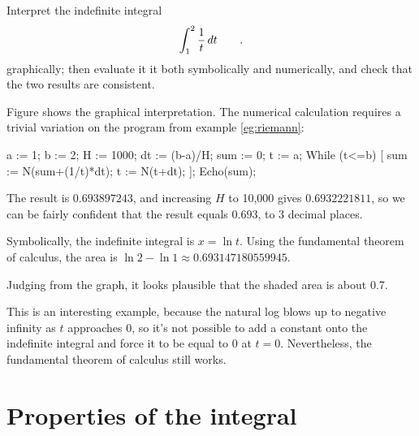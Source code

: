\begin{eg}\label{eg:hyperbola}
\egquestion Interpret the indefinite integral
\begin{equation*}
  \int_{1}^{2} \frac{1}{t}\mathop{d\!} t \qquad .
\end{equation*}
graphically; then evaluate it it both symbolically and numerically, and check that the two results
are consistent.


\eganswer Figure  shows the graphical interpretation. The numerical calculation
requires a trivial variation on the program from example \ref{eg:riemann}:

\restartLineNumbers
\begin{Code}
  a := 1;
  b := 2;
  H := 1000;
  dt := (b-a)/H;
  sum := 0;
  t := a;
  While (t<=b) [
    sum := N(sum+(1/t)*dt);
    t := N(t+dt);
  ];
  Echo(sum);
\end{Code}
The result is $0.693897243$, and increasing $H$ to 10,000 gives $0.6932221811$, so we can be fairly confident that
the result equals $0.693$, to 3 decimal places.

Symbolically, the indefinite integral is $x=\ln t$. Using the fundamental theorem of calculus, the area
is $\ln 2-\ln 1\approx 0.693147180559945$.

Judging from the graph, it looks plausible that the shaded area is about 0.7.

This is an interesting example, because the natural log blows up to negative infinity as $t$ approaches 0,
so it's not possible to add a constant onto the indefinite integral and force it to be equal to
0 at $t=0$. Nevertheless, the fundamental theorem of calculus still works.

\end{eg}


\section{Properties of the integral}

